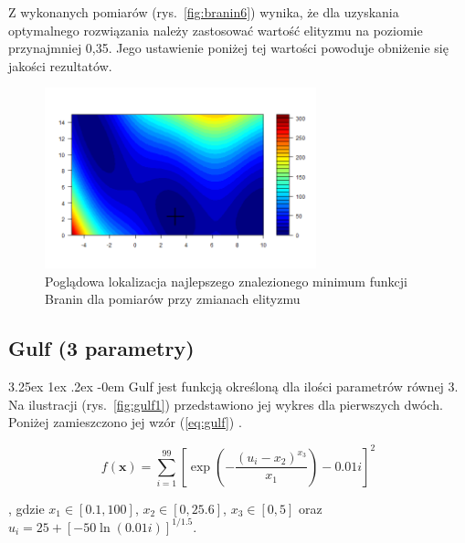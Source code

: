 \documentclass[11pt, a4paper]{article}
\makeatletter
\newcommand{\fbi}{\leavevmode{\parindent=1em\indent}}
\renewcommand\paragraph{\@startsection{paragraph}{5}{\z@}
  {3.25ex \@plus1ex \@minus.2ex}
  {-0em}
  {\normalfont\normalsize\bfseries}}
\makeatother
\begin{document}
\fbi
Z wykonanych pomiarów (rys.~\ref{fig:branin6}) wynika, że dla uzyskania optymalnego rozwiązania należy zastosować wartość elityzmu na poziomie przynajmniej 0,35. Jego ustawienie poniżej tej wartości powoduje obniżenie się jakości rezultatów.

\begin{figure}[H]
	\centering
	\includegraphics[width=0.7\textwidth]{./assets/Branin6elt.png}
	\caption{Poglądowa lokalizacja najlepszego znalezionego minimum funkcji Branin dla pomiarów przy zmianach elityzmu}
	\label{fig:branin6elt}
\end{figure}

\newpage
\subsection{Gulf (3 parametry)}
\paragraph{}
Gulf jest funkcją określoną dla ilości parametrów równej 3. Na ilustracji (rys.~\ref{fig:gulf1}) przedstawiono jej wykres dla pierwszych dwóch. Poniżej zamieszczono jej wzór (\ref{eq:gulf}) \cite{test4}.

\begin{equation}\label{eq:gulf}
f(\boldsymbol{x}) = \sum_{i=1}^{99} [\exp(- \frac{(u_i - x_2)^{x_3}}{x_1}) - 0.01i]^2
\end{equation}

, gdzie $ x_1 \in [0.1, 100] $, $ x_2 \in [0, 25.6] $, $ x_3 \in [0, 5] $ oraz $ u_i = 25 + [-50 \ln (0.01i)]^{1/1.5} $.
\end{document}
